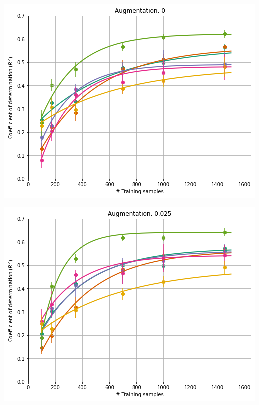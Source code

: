 \documentclass[a0paper,landscape,fontscale=0.365]{baposter}
\newenvironment{Figure}
  {\par\medskip\noindent\minipage{\linewidth}}
  {\endminipage\par\medskip}
\begin{document}
\begin{poster}
{\begin{multicols}{4}
    \begin{Figure}
        \centering
        \includegraphics[width=1.0\linewidth]{figures/curves_aug_0}
    \end{Figure}
    \columnbreak

    \begin{Figure}
        \centering
        \includegraphics[width=1.0\linewidth]{figures/curves_aug_40}
    \end{Figure}
    \columnbreak


\end{multicols}}
\end{poster}
\end{document}
